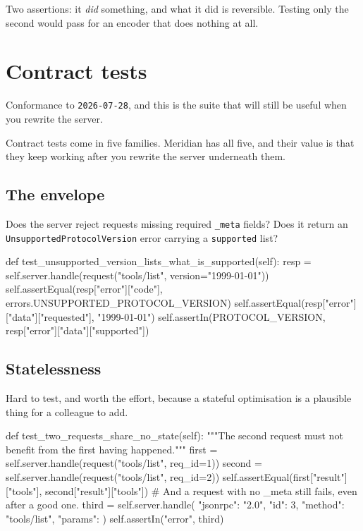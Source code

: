 Two assertions: it \emph{did} something, and what it did is reversible. Testing
only the second would pass for an encoder that does nothing at all.

\section{Contract tests}

Conformance to \texttt{2026-07-28}, and this is the suite that will still be
useful when you rewrite the server.

Contract tests come in five families. Meridian has all five, and their value is
that they keep working after you rewrite the server underneath them.

\subsection{The envelope}

Does the server reject requests missing required \texttt{\_meta} fields? Does
it return an \texttt{Unsupported\-Protocol\-Version} error carrying a
\texttt{supported} list?

\begin{py}
def test_unsupported_version_lists_what_is_supported(self):
    resp = self.server.handle(request("tools/list", version="1999-01-01"))
    self.assertEqual(resp["error"]["code"], errors.UNSUPPORTED_PROTOCOL_VERSION)
    self.assertEqual(resp["error"]["data"]["requested"], "1999-01-01")
    self.assertIn(PROTOCOL_VERSION, resp["error"]["data"]["supported"])
\end{py}

\subsection{Statelessness}

Hard to test, and worth the effort, because a stateful optimisation is a
plausible thing for a colleague to add.

\begin{py}
def test_two_requests_share_no_state(self):
    """The second request must not benefit from the first having happened."""
    first = self.server.handle(request("tools/list", req_id=1))
    second = self.server.handle(request("tools/list", req_id=2))
    self.assertEqual(first["result"]["tools"], second["result"]["tools"])
    # And a request with no _meta still fails, even after a good one.
    third = self.server.handle(
        {"jsonrpc": "2.0", "id": 3, "method": "tools/list", "params": {}})
    self.assertIn("error", third)
\end{py}

